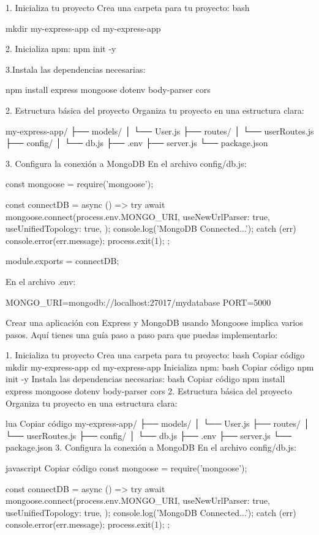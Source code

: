 1. Inicializa tu proyecto
Crea una carpeta para tu proyecto:
bash

mkdir my-express-app
cd my-express-app

2. Inicializa npm:
npm init -y

3.Instala las dependencias necesarias:

npm install express mongoose dotenv body-parser cors

2. Estructura básica del proyecto
Organiza tu proyecto en una estructura clara:

my-express-app/
├── models/
│   └── User.js
├── routes/
│   └── userRoutes.js
├── config/
│   └── db.js
├── .env
├── server.js
└── package.json



3. Configura la conexión a MongoDB
En el archivo config/db.js:

const mongoose = require('mongoose');

const connectDB = async () => {
  try {
    await mongoose.connect(process.env.MONGO_URI, {
      useNewUrlParser: true,
      useUnifiedTopology: true,
    });
    console.log('MongoDB Connected...');
  } catch (err) {
    console.error(err.message);
    process.exit(1);
  }
};

module.exports = connectDB;


En el archivo .env:

MONGO_URI=mongodb://localhost:27017/mydatabase
PORT=5000




Crear una aplicación con Express y MongoDB usando Mongoose implica varios pasos. Aquí tienes una guía paso a paso para que puedas implementarlo:

1. Inicializa tu proyecto
Crea una carpeta para tu proyecto:
bash
Copiar código
mkdir my-express-app
cd my-express-app
Inicializa npm:
bash
Copiar código
npm init -y
Instala las dependencias necesarias:
bash
Copiar código
npm install express mongoose dotenv body-parser cors
2. Estructura básica del proyecto
Organiza tu proyecto en una estructura clara:

lua
Copiar código
my-express-app/
├── models/
│   └── User.js
├── routes/
│   └── userRoutes.js
├── config/
│   └── db.js
├── .env
├── server.js
└── package.json
3. Configura la conexión a MongoDB
En el archivo config/db.js:

javascript
Copiar código
const mongoose = require('mongoose');

const connectDB = async () => {
  try {
    await mongoose.connect(process.env.MONGO_URI, {
      useNewUrlParser: true,
      useUnifiedTopology: true,
    });
    console.log('MongoDB Connected...');
  } catch (err) {
    console.error(err.message);
    process.exit(1);
  }
};

